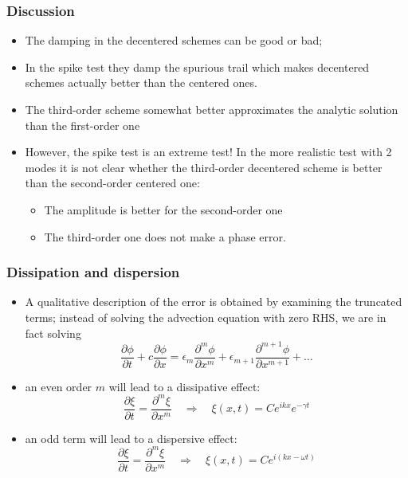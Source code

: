 \documentclass[aspectratio=149,9pt]{beamer}
\begin{document}
\begin{frame}
	\frametitle{Discussion}
	\vfill\begin{itemize}
		\item The damping in the decentered schemes can be good or bad;\vfill
		\item In the spike test they damp the spurious trail which makes decentered schemes actually better than the centered ones.\vfill
		\item The third-order scheme somewhat better approximates the analytic solution than the first-order one\vfill
		\item However, the spike test is an extreme test! In the more realistic test with 2 modes it is not clear whether the third-order decentered scheme is better than the second-order centered one:\vspace*{1ex}
			\begin{itemize}
				\item The amplitude is better for the second-order one
				\item The third-order one does not make a phase error.
			\end{itemize}
	\end{itemize}\vfill
\end{frame}
%
%
\begin{frame}
	\frametitle{Dissipation and dispersion}
	\vfill\begin{itemize}
		\item A qualitative description of the error is obtained by examining the truncated terms; instead of solving the advection equation with zero RHS, we are in fact solving
			\begin{equation*}
				\frac{\partial \phi}{\partial t}+c\frac{\partial \phi}{\partial x}=
					\epsilon_m\frac{\partial^m \phi}{\partial x^m}+
					\epsilon_{m+1}\frac{\partial^{m+1} \phi}{\partial x^{m+1}}+\ldots
			\end{equation*}\vfill
		\item an even order $m$ will lead to a dissipative effect:
			\begin{equation*}
				\frac{\partial \xi}{\partial t} = \frac{\partial^{m} \xi}{\partial x^{m}}
					\quad\Rightarrow\quad\xi (x,t) = C e^{ikx} e^{-\gamma t}
			\end{equation*}\vfill
		\item an odd term will lead to a dispersive effect:
			\begin{equation*}
				\frac{\partial \xi}{\partial t} = \frac{\partial^m \xi}{\partial x^m}
					\quad\Rightarrow\quad\xi (x,t) = C e^{i \left( kx - \omega t \right)}
			\end{equation*}
	\end{itemize}\vfill
\end{frame}
\end{document}
